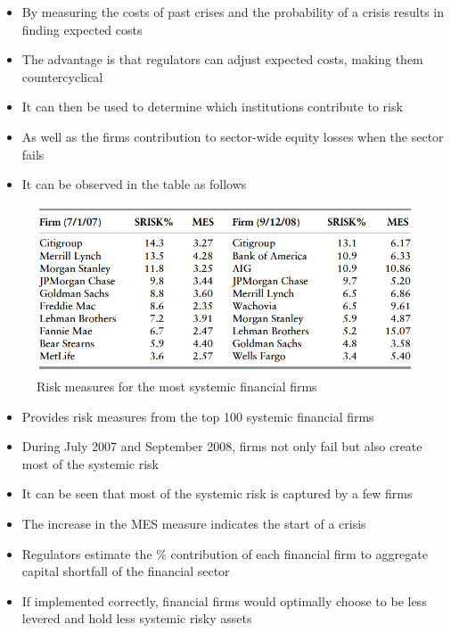 \documentclass[11pt]{beamer}
\begin{document}

\begin{frame}
\begin{itemize}\itemsep10pt
\item By measuring the costs of past crises and the probability of a crisis results in finding expected costs
\item The advantage is that regulators can adjust expected costs, making them countercyclical
\item It can then be used to determine which institutions contribute to risk
\item As well as the firms contribution to sector-wide equity losses when the sector fails
\item It can be observed in the table as follows
\end{itemize}
\end{frame}


\begin{frame}
\begin{figure}
\includegraphics[width=\textwidth]{table5_1.png}
\caption{Risk measures for the most systemic financial firms}
\end{figure}
\end{frame}


\begin{frame}
\begin{itemize}\itemsep10pt
\item Provides risk measures from the top 100 systemic financial firms
\item During July 2007 and September 2008, firms not only fail but also create most of the systemic risk
\item It can be seen that most of the systemic risk is captured by a few firms
\item The increase in the MES measure indicates the start of a crisis
\item Regulators estimate the \% contribution of each financial firm to aggregate capital shortfall of the financial sector
\item If implemented correctly, financial firms would optimally choose to be less levered and hold less systemic risky assets
\end{itemize}
\end{frame}
\end{document}
